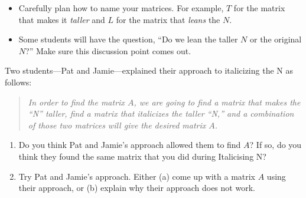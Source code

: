 \begin{iola}
\begin{annotation}
		\begin{notes}
			\begin{itemize}
				\item Carefully plan how to name your matrices. For example, $T$ for
					the matrix that makes it \emph{taller} and $L$ for the matrix
					that \emph{leans} the $N$.
				\item Some students will have the question, ``Do we lean the taller $N$ or the original $N$?''
					Make sure this discussion point comes out.

			\end{itemize}
		\end{notes}
	\end{annotation}

Two students---Pat and Jamie---explained their approach to italicizing the N as follows:
\begin{quote}\itshape
	In order to find the matrix $A$, we are going to find a matrix that makes the ``N'' taller,
	find a matrix that italicizes the taller ``N,'' and a combination of those two matrices
	will give the desired matrix $A$.
\end{quote}

\begin{enumerate}
	\item Do you think Pat and Jamie's approach allowed them to find $A$?  If so, do
		you think they found the same matrix that you did during Italicising N?
	\item Try Pat and Jamie's approach.  Either (a) come up with a matrix $A$ using
		their approach, or (b) explain why their approach does not work.
\end{enumerate}

\end{iola}

